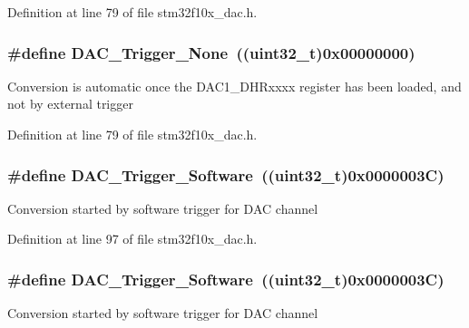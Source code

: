 Definition at line 79 of file stm32f10x\+\_\+dac.\+h.

\subsubsection[{\texorpdfstring{D\+A\+C\+\_\+\+Trigger\+\_\+\+None}{DAC_Trigger_None}}]{\setlength{\rightskip}{0pt plus 5cm}\#define D\+A\+C\+\_\+\+Trigger\+\_\+\+None~(({\bf uint32\+\_\+t})0x00000000)}\hypertarget{group___d_a_c__trigger__selection_ga7849138e043267668d755390d923e4ba}{}\label{group___d_a_c__trigger__selection_ga7849138e043267668d755390d923e4ba}
Conversion is automatic once the D\+A\+C1\+\_\+\+D\+H\+Rxxxx register has been loaded, and not by external trigger 

Definition at line 79 of file stm32f10x\+\_\+dac.\+h.

\subsubsection[{\texorpdfstring{D\+A\+C\+\_\+\+Trigger\+\_\+\+Software}{DAC_Trigger_Software}}]{\setlength{\rightskip}{0pt plus 5cm}\#define D\+A\+C\+\_\+\+Trigger\+\_\+\+Software~(({\bf uint32\+\_\+t})0x0000003\+C)}\hypertarget{group___d_a_c__trigger__selection_gadef77bb8bbd109232900902402ef637f}{}\label{group___d_a_c__trigger__selection_gadef77bb8bbd109232900902402ef637f}
Conversion started by software trigger for D\+AC channel 

Definition at line 97 of file stm32f10x\+\_\+dac.\+h.

\subsubsection[{\texorpdfstring{D\+A\+C\+\_\+\+Trigger\+\_\+\+Software}{DAC_Trigger_Software}}]{\setlength{\rightskip}{0pt plus 5cm}\#define D\+A\+C\+\_\+\+Trigger\+\_\+\+Software~(({\bf uint32\+\_\+t})0x0000003\+C)}\hypertarget{group___d_a_c__trigger__selection_gadef77bb8bbd109232900902402ef637f}{}\label{group___d_a_c__trigger__selection_gadef77bb8bbd109232900902402ef637f}
Conversion started by software trigger for D\+AC channel 

